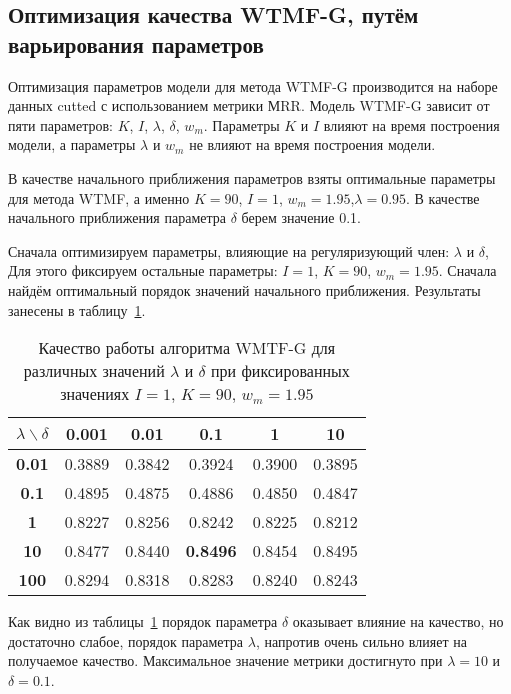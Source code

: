 \subsection{Оптимизация качества WTMF-G, путём варьирования параметров}
    Оптимизация параметров модели для метода WTMF-G производится на наборе данных cutted с использованием метрики МRR.
    Модель WTMF-G зависит от пяти параметров: $K$, $I$, $\lambda$, $\delta$, $w_m$.
    Параметры $K$ и $I$ влияют на время построения модели, а параметры $\lambda$ и $w_m$ не влияют на время построения модели.

    В качестве начального приближения параметров взяты оптимальные параметры для метода WTMF, а именно $K=90$, $I=1$, $w_m=1.95$,$\lambda=0.95$. В качестве начального приближения параметра $\delta$ берем значение 0.1.

    Сначала оптимизируем параметры, влияющие на регуляризующий член: $\lambda$ и $\delta$,
    Для этого фиксируем остальные параметры: $I=1$, $K=90$, $w_m=1.95$.
    Сначала найдём оптимальный порядок значений начального приближения. Результаты занесены в таблицу~\ref{tabular:wtmfg_test1}.
    \begin{table}[ht!]
        \caption{Качество работы алгоритма WMTF-G для различных значений $\lambda$ и $\delta$ при фиксированных значениях $I=1$, $K=90$, $w_m=1.95$ \bigskip}
        \centering

        \label{tabular:wtmfg_test1}
        \begin{tabular}{|c|c|c|c|c|c|} \hline
            $\lambda \backslash \delta$ & \bf{0.001} & \bf{0.01} & \bf{0.1} & \bf{1} & \bf{10}  \\ \hline
            \bf{0.01} & 0.3889 & 0.3842 & 0.3924 & 0.3900 & 0.3895 \\ \hline
            \bf{0.1}  & 0.4895 & 0.4875 & 0.4886 & 0.4850 & 0.4847  \\ \hline
            \bf{1}    & 0.8227 & 0.8256 & 0.8242 & 0.8225 & 0.8212 \\ \hline
            \bf{10}   & 0.8477 & 0.8440 & \bf{0.8496} & 0.8454 & 0.8495 \\ \hline
            \bf{100}  & 0.8294 & 0.8318 & 0.8283 & 0.8240  & 0.8243 \\ \hline
        \end{tabular}
    \end{table}
    Как видно из таблицы~\ref{tabular:wtmfg_test1} порядок параметра $\delta$ оказывает влияние на качество, но достаточно слабое, порядок параметра $\lambda$, напротив очень сильно влияет на получаемое качество.
    Максимальное значение метрики достигнуто при $\lambda=10$ и $\delta=0.1$.

